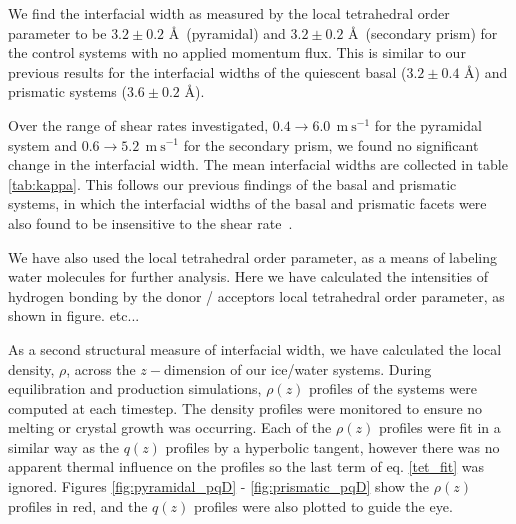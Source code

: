 \documentclass[aps,jcp,preprint,showpacs,superscriptaddress,groupedaddress]{revtex4}  %
\begin{document}



We find the interfacial width as measured by the local tetrahedral order 
parameter to be $3.2 \pm 0.2$ \AA\ (pyramidal) and
$3.2 \pm 0.2$ \AA\ (secondary prism) for the control systems with no
applied momentum flux. This is similar to our previous results for the
interfacial widths of the quiescent basal ($3.2 \pm 0.4$ \AA) and
prismatic systems ($3.6 \pm 0.2$ \AA).

Over the range of shear rates investigated, $0.4 \rightarrow
6.0~\mathrm{~m~s}^{-1}$ for the pyramidal system and $0.6 \rightarrow
5.2~\mathrm{~m~s}^{-1}$ for the secondary prism, we found no
significant change in the interfacial width. The mean interfacial
widths are collected in table \ref{tab:kappa}. This follows our
previous findings of the basal and prismatic systems, in which the
interfacial widths of the basal and prismatic facets were also found
to be insensitive to the shear rate~\cite{Louden13}.

We have also used the local tetrahedral order parameter, as a means of 
labeling water molecules for further analysis. Here we have calculated
the intensities of hydrogen bonding by the donor / acceptors local
tetrahedral order parameter, as shown in figure. etc...

As a second structural measure of interfacial width, we have calculated
the local density, $\rho$, across the $z-$dimension of our ice/water systems. 
During equilibration and production simulations, $\rho(z)$ profiles of the 
systems were computed at each timestep. The density profiles were
monitored to ensure no melting or crystal growth was occurring. 
Each of the $\rho(z)$
profiles were fit in a similar way as the $q(z)$ profiles by a hyperbolic 
tangent, however there was no apparent thermal influence on the profiles
so the last term of eq. \eqref{tet_fit} was ignored. Figures 
\ref{fig:pyramidal_pqD} - \ref{fig:prismatic_pqD} show the $\rho(z)$ profiles
in red, and the $q(z)$ profiles were also plotted to guide the eye.
\end{document}
